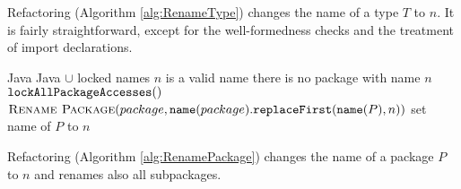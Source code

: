 Refactoring  (Algorithm \ref{alg:RenameType}) changes the name of a type $T$ to $n$.  It is fairly straightforward, except for the well-formedness checks and the treatment of import declarations.



\begin{algorithm}[p]
\caption{$\refactoring{Rename Package}(P : \type{Package}, n : \type{Name})$}\label{alg:RenamePackage}
\begin{algorithmic}[1]
\REQUIRE Java
\ENSURE Java $\cup$ locked names
\medskip
\STATE \assert $n$ is a valid name
\STATE \assert there is no package with name $n$
\STATE $\text{\texttt{lockAllPackageAccesses}}()$
  \STATE $\textsc{Rename Package}(package, \text{\texttt{name}}(package).\text{\texttt{replaceFirst}}(\text{\texttt{name}}(P), n))$
\ENDFOR
\STATE set name of $P$ to $n$
\end{algorithmic}
\end{algorithm}

Refactoring  (Algorithm \ref{alg:RenamePackage}) changes the name of a package $P$ to $n$ and renames also all subpackages.


